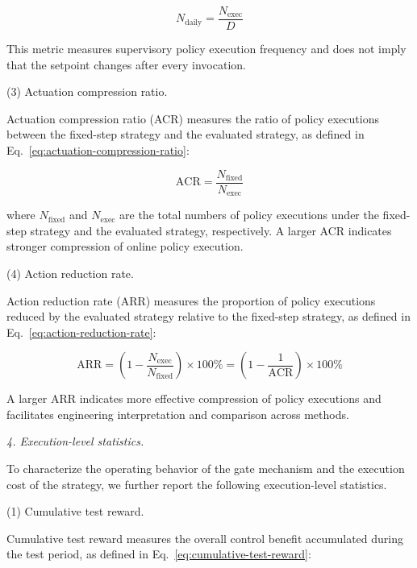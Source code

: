 \documentclass[preprint,12pt]{elsarticle}
\begin{document}
\[
N_{\text{daily}} = \frac{N_{\text{exec}}}{D} \tag{31}\label{eq:daily-trigger-count}
\]

This metric measures supervisory policy execution frequency and does not imply that the setpoint changes after every invocation.

\par\smallskip
\noindent (3) Actuation compression ratio.
\par\nobreak\noindent Actuation compression ratio (ACR) measures the ratio of policy executions between the fixed-step strategy and the evaluated strategy, as defined in Eq.~\eqref{eq:actuation-compression-ratio}:

\[
\mathrm{ACR} = \frac{N_{\text{fixed}}}{N_{\text{exec}}} \tag{32}\label{eq:actuation-compression-ratio}
\]

\noindent where \(N_{\text{fixed}}\) and \(N_{\text{exec}}\) are the total numbers of policy executions under the fixed-step strategy and the evaluated strategy, respectively. A larger ACR indicates stronger compression of online policy execution.

\par\smallskip
\noindent (4) Action reduction rate.
\par\nobreak\noindent Action reduction rate (ARR) measures the proportion of policy executions reduced by the evaluated strategy relative to the fixed-step strategy, as defined in Eq.~\eqref{eq:action-reduction-rate}:

\[
\mathrm{ARR}=\left(1-\frac{N_{\text{exec}}}{N_{\text{fixed}}}\right)\times 100\% = \left(1-\frac{1}{\mathrm{ACR}}\right)\times 100\% \tag{33}\label{eq:action-reduction-rate}
\]

A larger ARR indicates more effective compression of policy executions and facilitates engineering interpretation and comparison across methods.

\par\medskip
\noindent\textit{4. Execution-level statistics.}\label{execution-level-statistics}
\par\smallskip

To characterize the operating behavior of the gate mechanism and the execution cost of the strategy, we further report the following execution-level statistics.

\par\smallskip
\noindent (1) Cumulative test reward.
\par\nobreak\noindent Cumulative test reward measures the overall control benefit accumulated during the test period, as defined in Eq.~\eqref{eq:cumulative-test-reward}:
\end{document}
